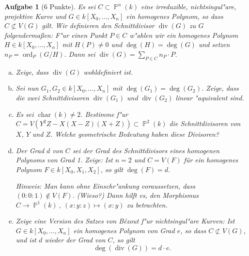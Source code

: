 \documentclass[a4paper, 12pt, numbers=noendperiod, chapterprefix=true]{scrbook}
\theoremstyle{break}
\newtheorem{Aufg}{Aufgabe}
\theoremstyle{nonumberbreak}
\theoremstyle{nonumberplain}
\DeclareMathOperator{\Char}{char} %
\DeclareMathOperator{\Divisor}{div}
\DeclareMathOperator{\ord}{ord}
\newcommand{\A}{\mathbb{A}}
\DeclareMathOperator{\Projective}{\mathbb{P}} %
\begin{document}
\begin{Aufg}[6 Punkte]
Es sei $C \subset \Projective^n(k)$ eine irreduzible, nichtsingul"are, projektive Kurve und $G\in k[X_0,\dots,X_n]$ ein homogenes Polynom, so dass $C\not\subset V(G)$ gilt. Wir definieren den Schnittdivisor $\Divisor(G)$ zu $G$ folgenderma\ss en: F"ur einen Punkt $P\in C$ w"ahlen wir ein homogenes Polynom $H\in k[X_0,\dots,X_n]$ mit $H(P)\neq 0$ und $\deg(H) = \deg(G)$ und setzen $n_P = \ord_P(G/H)$. Dann sei $\Divisor(G) = \sum_{P\in C} n_P\cdot P$.
\begin{enumerate}[a)]
\item
	Zeige, dass $\Divisor(G)$ wohldefiniert ist.
\item
	Sei nun $G_1, G_2 \in k[X_0,\dots,X_n]$ mit $\deg(G_1) = \deg(G_2)$. Zeige, dass die zwei Schnittdivisoren $\Divisor(G_1)$ und $\Divisor(G_2)$ linear "aquivalent sind.
\item
	Es sei $\Char(k)\neq 2$. Bestimme f"ur $C= V(Y^2Z - X(X-Z)(X+Z))\subset \Projective^2(k)$ die Schnittdivisoren von $X$, $Y$ und $Z$. Welche geometrische Bedeutung haben diese Divisoren?
\item
	Der Grad $d$ von $C$ sei der Grad des Schnittdivisors eines homogenen Polynoms von Grad 1. Zeige: Ist $n=2$ und $C= V(F)$ für ein homogenes Polynom $F\in k[X_0,X_1,X_2]$, so gilt $\deg(F) = d$.
	
	\emph{Hinweis: Man kann ohne Einschr"ankung voraussetzen, dass $(0:0:1)\not\in V(F)$. (Wieso?) Dann hilft es, den Morphismus $C\to \Projective^1(k)\ ,\ (x:y:z)\mapsto (x:y)$ zu betrachten.}
\item
	Zeige eine Version des Satzes von B\'ezout f"ur nichtsingul"are Kurven: Ist $G\in k[X_0,\dots,X_n]$ ein homogenes Polynom von Grad $e$, so dass $C\not\subset V(G)$, und ist $d$ wieder der Grad von $C$, so gilt
		\[\deg(\Divisor(G)) = d\cdot e.\]
\end{enumerate}\end{Aufg}
\end{document}
